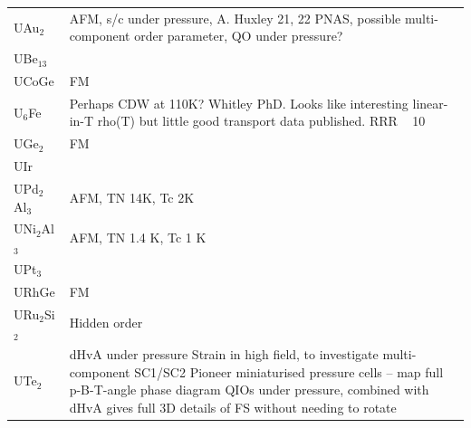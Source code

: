 \begin{table}
  \begin{tabular}{l l}
    UAu$_2$ &
    AFM, s/c under pressure, A. Huxley 21, 22 PNAS, possible multi-component order parameter, QO under pressure?
    \\

    UBe$_{13}$ & \\
    
    UCoGe & 
    FM \\
    
    U$_6$Fe & 
    Perhaps CDW at 110K? Whitley PhD. Looks like interesting linear-in-T rho(T) but little good transport data published. RRR ~ 10 \\
    
    UGe$_2$  & FM \\
    UIr & \\
    UPd$_2$Al$_3$ & 
    AFM, TN 14K, Tc 2K
    \\

    UNi$_2$Al$_3$ &
    AFM, TN 1.4 K, Tc 1 K
    \\

    UPt$_3$ & \\
  
    URhGe & 
    FM
    \\

    URu$_2$Si$_2$ & 
    Hidden order \\
  
    UTe$_2$ & 
      dHvA under pressure
      Strain in high field, to investigate multi-component SC1/SC2
      Pioneer miniaturised pressure cells – map full p-B-T-angle phase diagram 
      QIOs under pressure, combined with dHvA gives full 3D details of FS without needing to rotate \\
  \end{tabular}
\end{table}

